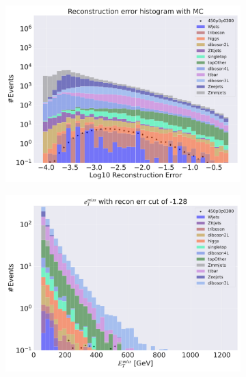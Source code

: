 \begin{figure}[H]
    \centering
    \begin{subfigure}{.49\textwidth}
        \includegraphics[width=\textwidth]{Figures/AE_testing/small/3lep/b_data_recon_big_rm3_feats_sig_450p0p0300.pdf}
        \caption{ }
        \label{fig:AE_3lep_small_450_2}
    \end{subfigure}
    \hfill
    \begin{subfigure}{.49\textwidth}
        \includegraphics[width=\textwidth]{Figures/AE_testing/small/3lep/b_data_recon_big_rm3_feats_sig_450p0p0300_etmiss_recon_errcut_-1.28.pdf}
        \caption{}
        \label{fig:AE_3lep_small_etmiss_450_2}
    \end{subfigure}

\end{figure}
